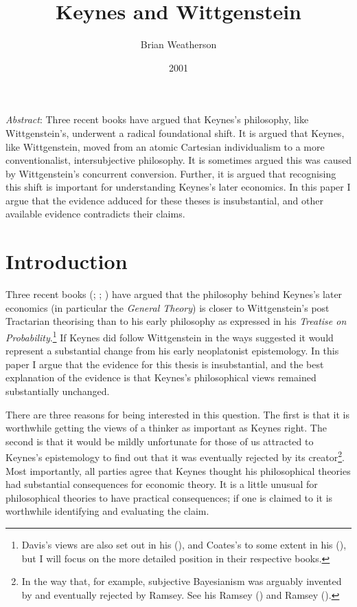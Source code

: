 \documentclass[
  11pt,
  letterpaper,
  DIV=11,
  numbers=noendperiod,
  twoside]{scrartcl}
\title{Keynes and Wittgenstein}
\author{Brian Weatherson}
\date{2001}
\renewenvironment{abstract}
 {\vspace{-1.25cm}
 \quotation\small\noindent\emph{Abstract}:}
 {\endquotation}
\begin{document}
\maketitle
\begin{abstract}
Three recent books have argued that Keynes's philosophy, like
Wittgenstein's, underwent a radical foundational shift. It is argued
that Keynes, like Wittgenstein, moved from an atomic Cartesian
individualism to a more conventionalist, intersubjective philosophy. It
is sometimes argued this was caused by Wittgenstein's concurrent
conversion. Further, it is argued that recognising this shift is
important for understanding Keynes's later economics. In this paper I
argue that the evidence adduced for these theses is insubstantial, and
other available evidence contradicts their claims.
\end{abstract}


\section{Introduction}\label{introduction}

Three recent books (;
;
) have argued that the philosophy
behind Keynes's later economics (in particular the \emph{General
Theory}) is closer to Wittgenstein's post Tractarian theorising than to
his early philosophy as expressed in his \emph{Treatise on
Probability}.\footnote{Davis's views are also set out in his
  (), and Coates's to some extent in his
  (), but I will focus on the more
  detailed position in their respective books.} If Keynes did follow
Wittgenstein in the ways suggested it would represent a substantial
change from his early neoplatonist epistemology. In this paper I argue
that the evidence for this thesis is insubstantial, and the best
explanation of the evidence is that Keynes's philosophical views
remained substantially unchanged.

There are three reasons for being interested in this question. The first
is that it is worthwhile getting the views of a thinker as important as
Keynes right. The second is that it would be mildly unfortunate for
those of us attracted to Keynes's epistemology to find out that it was
eventually rejected by its creator\footnote{In the way that, for
  example, subjective Bayesianism was arguably invented by and
  eventually rejected by Ramsey. See his Ramsey
  () and Ramsey
  ().}. Most importantly, all
parties agree that Keynes thought his philosophical theories had
substantial consequences for economic theory. It is a little unusual for
philosophical theories to have practical consequences; if one is claimed
to it is worthwhile identifying and evaluating the claim.
\end{document}
